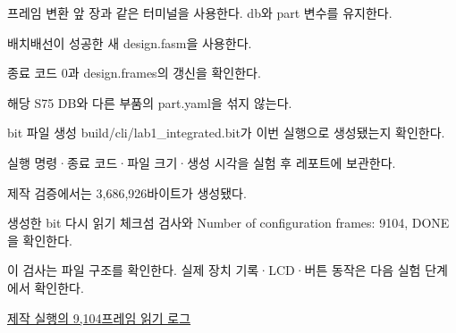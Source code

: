 \begin{frame}{프레임 변환}\relax
\small
{}
앞 장과 같은 터미널을 사용한다. db와 part 변수를 유지한다.\par\vspace{0.22cm}배치배선이 성공한 새 design.fasm을 사용한다.\par\vspace{0.22cm}종료 코드 0과 design.frames의 갱신을 확인한다.\par\vspace{0.22cm}해당 S75 DB와 다른 부품의 part.yaml을 섞지 않는다.\par
\end{frame}

\begin{frame}{bit 파일 생성}\relax
\small
{}
build/cli/lab1\_integrated.bit가 이번 실행으로 생성됐는지 확인한다.\par\vspace{0.22cm}실행 명령·종료 코드·파일 크기·생성 시각을 실험 후 레포트에 보관한다.\par\vspace{0.22cm}제작 검증에서는 3,686,926바이트가 생성됐다.\par
\end{frame}

\begin{frame}{생성한 bit 다시 읽기}\relax
\small
{}
체크섬 검사와 Number of configuration frames: 9104, DONE을 확인한다.\par\vspace{0.22cm}이 검사는 파일 구조를 확인한다. 실제 장치 기록·LCD·버튼 동작은 다음 실험 단계에서 확인한다.\par\href{https://github.com/Glaysia/ece2_26_2_2/blob/daily/0910/example/fpga_projects_hdl/LAB1/docs/cli-pr15-evidence/bitread.txt}{제작 실행의 9,104프레임 읽기 로그}
\end{frame}

